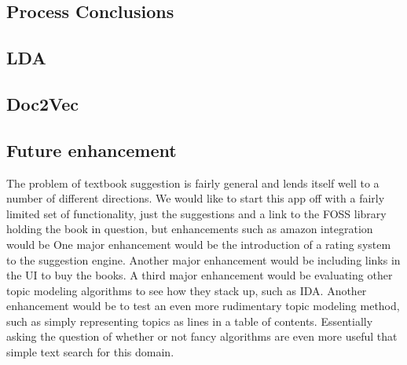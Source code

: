 
\subsection{Process Conclusions}
\label{sec:conc:process-conclusions}




\subsection{LDA}
\label{sec:conc:lda}




\subsection{Doc2Vec}
\label{sec:conc:doc2vec}



\subsection{Future enhancement}
The problem of textbook suggestion is fairly general and lends itself well to a number of different directions.
We would like to start this app off with a fairly limited set of functionality, just the suggestions and a link to the FOSS library holding the book in question, but enhancements such as amazon integration would be 
One major enhancement would be the introduction of a rating system to the suggestion engine.  
Another major enhancement would be including links in the UI to buy the books.
A third major enhancement would be evaluating other topic modeling algorithms to see how they stack up, such as IDA.
Another enhancement would be to test an even more rudimentary topic modeling method, such as simply representing topics as lines in a table of contents.  
Essentially asking the question of whether or not fancy algorithms are
even more useful that simple text search for this domain.


 